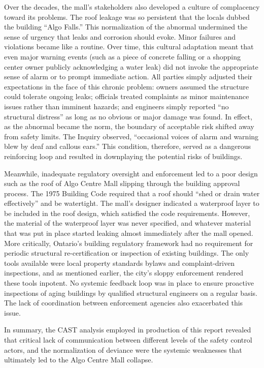 \documentclass[12pt]{article}
\begin{document}
Over the decades, the mall's stakeholders also developed a culture of complacency toward its problems. The roof leakage was so persistent that the locals dubbed the building “Algo Falls.” This normalization of the abnormal undermined the sense of urgency that leaks and corrosion should evoke. Minor failures and violations became like a routine. Over time, this cultural adaptation meant that even major warning events (such as a piece of concrete falling or a shopping center owner publicly acknowledging a water leak) did not invoke the appropriate sense of alarm or to prompt immediate action. All parties simply adjusted their expectations in the face of this chronic problem: owners assumed the structure could tolerate ongoing leaks; officials treated complaints as minor maintenance issues rather than imminent hazards; and engineers simply reported “no structural distress” as long as no obvious or major damage was found. In effect, as the abnormal became the norm, the boundary of acceptable risk shifted away from safety limits. The Inquiry observed, “occasional voices of alarm and warning blew by deaf and callous ears.” This condition, therefore, served as a dangerous reinforcing loop and resulted in downplaying the potential risks of buildings.

Meanwhile, inadequate regulatory oversight and enforcement led to a poor design such as the roof of Algo Centre Mall slipping through the building approval process. The 1975 Building Code required that a roof should “shed or drain water effectively” and be watertight. The mall's designer indicated a waterproof layer to be included in the roof design, which satisfied the code requirements. However, the material of the waterproof layer was never specified, and whatever material that was put in place started leaking almost immediately after the mall opened. More critically, Ontario's building regulatory framework had no requirement for periodic structural re-certification or inspection of existing buildings. The only tools available were local property standards bylaws and complaint-driven inspections, and as mentioned earlier, the city's sloppy enforcement rendered these tools inpotent. No systemic feedback loop was in place to ensure proactive inspections of aging buildings by qualified structural engineers on a regular basis. The lack of coordination between enforcement agencies also exacerbated this issue.

In summary, the CAST analysis employed in production of this report revealed that critical lack of communication between different levels of the safety control actors, and the normalization of deviance were the systemic weaknesses that ultimately led to the Algo Centre Mall collapse. 
\end{document}
